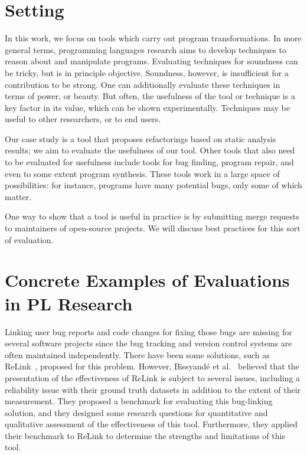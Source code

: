 \section{Setting}
In this work, we focus on tools which carry out program transformations. 
In more general terms, programming languages research aims to develop techniques to reason about and manipulate programs. Evaluating techniques for soundness can be tricky, but is in principle objective. Soundness, however, is insufficient for a contribution to be strong. One can additionally evaluate these techniques in terms of power, or beauty. But often, the usefulness of the tool or technique is a key factor in its value, which can be shown experimentally. Techniques may be useful to other researchers, or to end users.

Our case study is a tool that proposes refactorings based on static analysis results; we aim to evaluate the usefulness of our tool. Other tools that also need to be evaluated for usefulness include tools for bug finding, program repair, and even to some extent program synthesis. These tools work in a large space of possibilities: for instance, programs have many potential bugs, only some of which matter.

One way to show that a tool is useful in practice is by submitting merge requests to maintainers of open-source projects. We will discuss best practices for this sort of evaluation.


\section{Concrete Examples of Evaluations in PL Research}

Linking user bug reports and code changes for fixing those bugs are missing for several software projects since the bug tracking and version control systems are often maintained independently. There have been some solutions, such as ReLink~\cite{relink}, proposed for this problem. However, Bissyandé et al.~\cite{ee_buglinking} believed that the presentation of the effectiveness of ReLink is subject to several issues, including a reliability issue with their ground truth datasets in addition to the extent of their measurement. They proposed a benchmark for evaluating this bug-linking solution, and they designed some research questions for quantitative and qualitative assessment of the effectiveness of this tool. Furthermore, they applied their benchmark to ReLink to determine the strengths and limitations of this tool.

